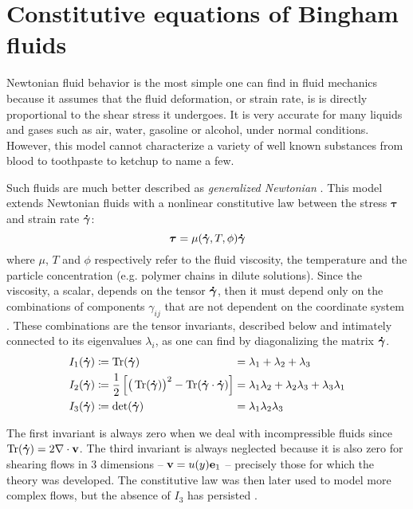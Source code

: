 \documentclass[11 pt]{report}
\begin{document}
\section{Constitutive equations of Bingham fluids}

Newtonian fluid behavior is the most simple one can find in fluid mechanics because it assumes that the fluid deformation, or strain rate, is is directly proportional to the shear stress it undergoes. It is very accurate for many liquids and gases such as air, water, gasoline or alcohol, under normal conditions. However, this model cannot characterize a variety of well known substances from blood to toothpaste to ketchup to name a few.

Such fluids are much better described as \textit{generalized Newtonian} \cite{Geophysical}. This model extends Newtonian fluids with a nonlinear constitutive law between the stress $\boldsymbol\tau$ and strain rate $\boldsymbol{\dot \gamma}$:
\begin{equation}
    \boldsymbol\tau = \mu(\boldsymbol{\dot \gamma}, T, \phi) \boldsymbol{\dot \gamma}
    \label{eq:power-law}
\end{equation}
where $\mu$, $T$ and $\phi$ respectively refer to the fluid viscosity, the temperature and the particle concentration (e.g. polymer chains in dilute solutions). Since the viscosity, a scalar, depends on the tensor $\boldsymbol{\dot \gamma}$, then it must depend only on the combinations of components $\gamma_{ij}$ that are not dependent on the coordinate system \cite{bird1987dynamics}. These combinations are the tensor invariants, described below and intimately connected to its eigenvalues $\lambda_i$, as one can find by diagonalizing the matrix $\boldsymbol{\dot \gamma}$.
\begin{equation}
    \begin{alignedat}{2}
        I_1(\boldsymbol{\dot \gamma}) &\coloneqq \Tr(\boldsymbol{\dot \gamma}) &&= \lambda_1 + \lambda_2 + \lambda_3\\
        I_2(\boldsymbol{\dot \gamma}) &\coloneqq \frac{1}{2} \left[\big(\Tr(\boldsymbol{\dot \gamma})\big)^2 - \Tr(\boldsymbol{\dot \gamma} \cdot \boldsymbol{\dot \gamma})\right] &&= \lambda_1\lambda_2 + \lambda_2\lambda_3 + \lambda_3\lambda_1\\
        I_3(\boldsymbol{\dot \gamma}) &\coloneqq \det(\boldsymbol{\dot \gamma}) &&= \lambda_1\lambda_2\lambda_3
    \end{alignedat}
\end{equation}

The first invariant is always zero when we deal with incompressible fluids since $\Tr(\boldsymbol{\dot \gamma}) = 2 \nabla \cdot \mathbf{v}$. The third invariant is always neglected because it is also zero for shearing flows in 3 dimensions -- $\mathbf{v} = u(y)\mathbf{e}_1$ -- precisely those for which the theory was developed. The constitutive law was then later used to model more complex flows, but the absence of $I_3$ has persisted \cite{bird1987dynamics}.
\end{document}

